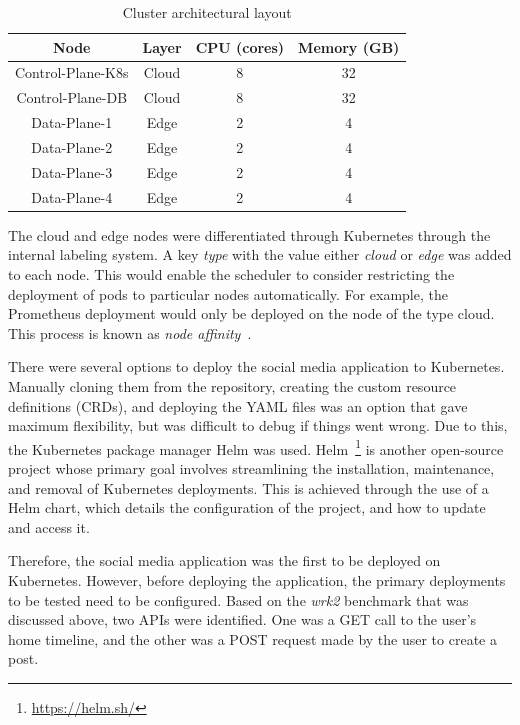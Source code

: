 \begin{table}
    \caption{Cluster architectural layout}\label{tab:cluster-hw-overview}
    \centering
    \begin{tabular}{cccc}
        \toprule
        \textbf{Node} & \textbf{Layer} & \textbf{CPU (cores)} & \textbf{Memory (GB)}\\
        \midrule
        Control-Plane-K8s & Cloud & 8 & 32\\
        Control-Plane-DB  & Cloud & 8 & 32\\
        Data-Plane-1      & Edge  & 2 & 4\\
        Data-Plane-2      & Edge  & 2 & 4\\
        Data-Plane-3      & Edge  & 2 & 4\\
        Data-Plane-4      & Edge  & 2 & 4\\
        \toprule
    \end{tabular}
\end{table}

The cloud and edge nodes were differentiated through Kubernetes through the internal labeling system. A key \textit{type} with the value either \textit{cloud} or \textit{edge} was added to each node. This would enable the scheduler to consider restricting the deployment of pods to particular nodes automatically. For example, the Prometheus deployment would only be deployed on the node of the type cloud. This process is known as \textit{node affinity}~\cite{santos2019towards}.\par

There were several options to deploy the social media application to Kubernetes. Manually cloning them from the repository, creating the custom resource definitions (CRDs), and deploying the YAML files was an option that gave maximum flexibility, but was difficult to debug if things went wrong. Due to this, the Kubernetes package manager Helm was used. Helm~\footnote{\url{https://helm.sh/}} is another open-source project whose primary goal involves streamlining the installation, maintenance, and removal of Kubernetes deployments. This is achieved through the use of a Helm chart, which details the configuration of the project, and how to update and access it.\par

Therefore, the social media application was the first to be deployed on Kubernetes. However, before deploying the application, the primary deployments to be tested need to be configured. Based on the \textit{wrk2} benchmark that was discussed above, two APIs were identified. One was a GET call to the user's home timeline, and the other was a POST request made by the user to create a post.\par

